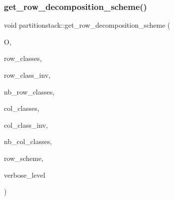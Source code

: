 \mbox{\label{classpartitionstack_a0e1a84aea3a6bc6d7653a0e9f73e8560}} 
\subsubsection{\texorpdfstring{get\+\_\+row\+\_\+decomposition\+\_\+scheme()}{get\_row\_decomposition\_scheme()}}
{\footnotesize\ttfamily void partitionstack\+::get\+\_\+row\+\_\+decomposition\+\_\+scheme (\begin{DoxyParamCaption}\item[{\mbox{\hyperlink{classorthogonal}{orthogonal}} \&}]{O,  }\item[{\mbox{\hyperlink{galois_8h_a09fddde158a3a20bd2dcadb609de11dc}{I\+NT}} $\ast$}]{row\+\_\+classes,  }\item[{\mbox{\hyperlink{galois_8h_a09fddde158a3a20bd2dcadb609de11dc}{I\+NT}} $\ast$}]{row\+\_\+class\+\_\+inv,  }\item[{\mbox{\hyperlink{galois_8h_a09fddde158a3a20bd2dcadb609de11dc}{I\+NT}}}]{nb\+\_\+row\+\_\+classes,  }\item[{\mbox{\hyperlink{galois_8h_a09fddde158a3a20bd2dcadb609de11dc}{I\+NT}} $\ast$}]{col\+\_\+classes,  }\item[{\mbox{\hyperlink{galois_8h_a09fddde158a3a20bd2dcadb609de11dc}{I\+NT}} $\ast$}]{col\+\_\+class\+\_\+inv,  }\item[{\mbox{\hyperlink{galois_8h_a09fddde158a3a20bd2dcadb609de11dc}{I\+NT}}}]{nb\+\_\+col\+\_\+classes,  }\item[{\mbox{\hyperlink{galois_8h_a09fddde158a3a20bd2dcadb609de11dc}{I\+NT}} $\ast$}]{row\+\_\+scheme,  }\item[{\mbox{\hyperlink{galois_8h_a09fddde158a3a20bd2dcadb609de11dc}{I\+NT}}}]{verbose\+\_\+level }\end{DoxyParamCaption})}

\mbox{\label{classpartitionstack_a13362337bacd51a6de12a305bcd08211}} 
